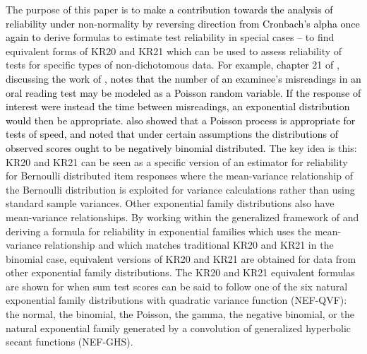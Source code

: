 \documentclass[12pt,epsfig]{article}
\newcommand{\changed}[1]{\textcolor{black}{#1}}
\begin{document}
The purpose of this paper is to \changed{make a contribution towards the analysis of reliability under non-normality by reversing direction from Cronbach's alpha once again to} derive formulas to estimate test reliability in special cases -- to find equivalent forms of KR20 and KR21 which can be used to assess reliability of tests for specific types of non-dichotomous data. \changed{For example, chapter 21 of \cite{Lord1968}, discussing the work of \cite{Rasch1960}, notes that the number of an examinee's misreadings in an oral reading test may be modeled as a Poisson random variable. If the response of interest were instead the time between misreadings, an exponential distribution would then be appropriate. \cite{Meredith1971} also showed that a Poisson process is appropriate for tests of speed, and noted that under certain assumptions the distributions of observed scores ought to be negatively binomial distributed.} The key idea is this: KR20 and KR21 can be seen as a specific version of an estimator for reliability for Bernoulli distributed item responses where the mean-variance relationship of the Bernoulli distribution is exploited for variance calculations rather than using standard sample variances. Other exponential family distributions also have mean-variance relationships. By working within the generalized framework of \cite{Foster2020} and deriving a formula for reliability in exponential families which uses the mean-variance relationship and which matches traditional KR20 and KR21 in the binomial case, equivalent versions of KR20 and KR21 are obtained for data from other exponential family distributions. The KR20 and KR21 equivalent formulas are shown for when sum test scores can be said to follow one of the six natural exponential family distributions with quadratic variance function (NEF-QVF): the normal, the binomial, the Poisson, the gamma, the negative binomial, or the natural exponential family generated by a convolution of generalized hyperbolic secant functions (NEF-GHS). %
\end{document}
